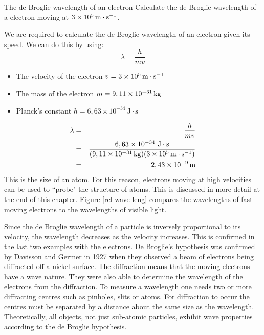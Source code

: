 \begin{wex}{The de Broglie wavelength of an electron}
{Calculate the de Broglie wavelength of a electron moving at $3 \times 10^{5}\,\mathrm{m \cdot s^{-1}}$.}
{
We are required to calculate the de Broglie wavelength of an electron given its speed. We can do this by using:
$$\lambda=\frac{h}{mv}$$

\begin{minipage}{.8\textwidth}
\begin{itemize}
\item The velocity of the electron {$v=3 \times 10^{5}\,\mathrm{m \cdot s^{-1}}$}
\item The mass of the electron {$m=9,11 \times 10^{-31}\,\mathrm{kg}$}
\item Planck's constant {$h=6,63\times10^{-34}~\mathrm{J\cdot s}$}
\end{itemize}
\end{minipage}
\begin{eqnarray*}
\lambda&=&\frac{h}{mv}\\
&=&\frac{6,63\times10^{-34}~\mathrm{J\cdot s}}{(9,11 \times 10^{-31}\,\mathrm{kg})(3 \times 10^{5}\,\mathrm{m \cdot s^{-1}})}\\
& = & 2,43 \times 10^{-9}\,\rm{m}
\end{eqnarray*}
This is the size of an atom. For this reason, electrons moving at high velocities can be used to ``probe" the structure of atoms. This is discussed in more detail at the end of this chapter.  Figure \ref{rel-wave-leng} compares the wavelengths of fast moving electrons to the wavelengths of visible light.}
\end{wex}

Since the de Broglie wavelength of a particle is inversely proportional to its velocity, the wavelength decreases as the velocity increases. This is confirmed in the last two examples with the electrons. 
De Broglie's hypothesis was confirmed by Davisson and Germer in 1927 when they observed a beam of electrons being diffracted off a nickel surface. The diffraction means that the moving electrons have a wave nature. They were also able to determine the wavelength of the electrons from the diffraction. To measure a wavelength one needs two or more diffracting centres such as pinholes, slits or atoms. For diffraction to occur the centres must be separated by a distance about the same size as the wavelength. Theoretically, all objects, not just sub-atomic particles, exhibit wave properties according to the de Broglie hypothesis.

